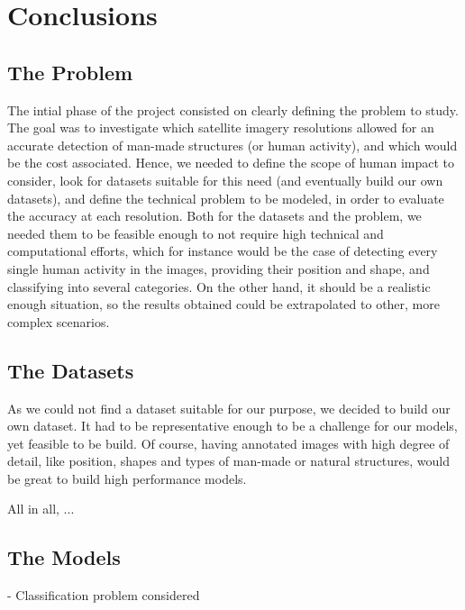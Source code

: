 
\chapter{Conclusions}

\label{Chapter6}


\section{The Problem}

The intial phase of the project consisted on clearly defining the problem to study. The goal was to investigate which satellite imagery resolutions allowed for an accurate detection of man-made structures (or human activity), and which would be the cost associated. Hence, we needed to define the scope of human impact to consider, look for datasets suitable for this need (and eventually build our own datasets), and define the technical problem to be modeled, in order to evaluate the accuracy at each resolution. Both for the datasets and the problem, we needed them to be feasible enough to not require high technical and computational efforts, which for instance would be the case of detecting every single human activity in the images, providing their position and shape, and classifying into several categories. On the other hand, it should be a realistic enough situation, so the results obtained could be extrapolated to other, more complex scenarios.

\section{The Datasets}

As we could not find a dataset suitable for our purpose, we decided to build our own dataset. It had to be representative enough to be a challenge for our models, yet feasible to be build. Of course, having annotated images with high degree of detail, like position, shapes and types of man-made or natural structures, would be great to build high performance models.

All in all, ...

\section{The Models}

- Classification problem considered

